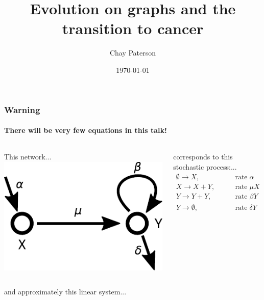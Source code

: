 \documentclass{beamer}
\title{Evolution on graphs and the transition to cancer}
\author{Chay Paterson}
\institute{University of Manchester}
\date{\today}
\begin{document}

\frame{\titlepage}

\begin{frame}
    \frametitle{Warning}
    \framesubtitle{There will be very few equations in this talk!}

    \begin{columns}
        \begin{column}{0.6\textwidth}
        This network...
        \includegraphics[width=\textwidth]{figures/diagram1}
        \end{column}
        \begin{column}{0.4\textwidth}
        corresponds to this stochastic process:...
        \begin{align}
            \emptyset \rightarrow X, &\qquad \mathrm{rate\;}\alpha
            \nonumber \\
            X \rightarrow X + Y, &\qquad\mathrm{rate\;}\mu X
            \nonumber \\
            Y \rightarrow Y + Y, &\qquad\mathrm{rate\;} \beta Y
            \nonumber \\
            Y \rightarrow \emptyset, &\qquad\mathrm{rate\;} \delta Y
            \nonumber
        \end{align}
        \end{column}
    \end{columns}

    and approximately this linear system...


\end{frame}
\end{document}
